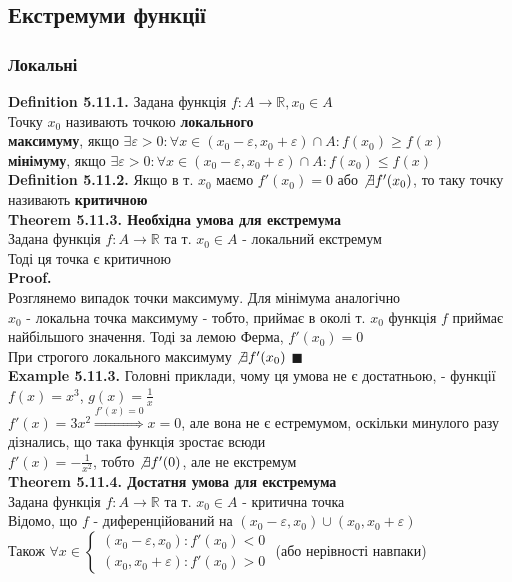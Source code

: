 \documentclass[a4paper, 14pt]{extarticle}
\def\huge{\displaystyle}
\def\bigline{\vspace{5mm}\\}
\def\defin#1{\textbf{Definition {#1}}}
\def\ex#1{\textbf{Example {#1}}}
\def\th#1{\textbf{Theorem {#1}}}
\def\proof{\textbf{Proof.}\\}
\def\bigline{\vspace{5mm}\\}
\def\qed{$\blacksquare$}
\begin{document}
\subsection{Екстремуми функції}
\subsubsection{Локальні}
\defin{5.11.1.} Задана функція $f: A \to \mathbb{R}, x_0 \in A$\\
Точку $x_0$ називають точкою \textbf{локального}\\
\textbf{максимуму}, якщо $\exists \varepsilon > 0: \forall x \in (x_0-\varepsilon, x_0 +\varepsilon) \cap A: f(x_0) \geq f(x)$\\
\textbf{мінімуму}, якщо $\exists \varepsilon > 0: \forall x \in (x_0-\varepsilon, x_0 +\varepsilon) \cap A: f(x_0) \leq f(x)$
\bigline
\defin{5.11.2.} Якщо в т. $x_0$ маємо $f'(x_0) = 0$ або $\not\exists f'(x_0)$, то таку точку називають \textbf{критичною}
\bigline
\th{5.11.3. Необхідна умова для екстремума}\\
Задана функція $f: A \to \mathbb{R}$ та т. $x_0 \in A$ - локальний екстремум\\
Тоді ця точка є критичною\\
\proof
Розглянемо випадок точки максимуму. Для мінімума аналогічно\\
$x_0$ - локальна точка максимуму - тобто, приймає в околі т. $x_0$ функція $f$ приймає найбільшого значення. Тоді за лемою Ферма, $f'(x_0) = 0$\\
При строгого локального максимуму $\not\exists f'(x_0)$ \qed
\bigline
\ex{5.11.3.} Головні приклади, чому ця умова не є достатньою, - функції $f(x) = x^3$, $g(x) = \huge \frac{1}{x}$\\
$f'(x) = 3x^2 \overset{f'(x) = 0}{\Rightarrow} x = 0$, але вона не є естремумом, оскільки минулого разу дізнались, що така функція зростає всюди\\
$f'(x) = \huge -\frac{1}{x^2}$, тобто $\not\exists f'(0)$, але не екстремум
\bigline
\th{5.11.4. Достатня умова для екстремума}\\
Задана функція $f: A \to \mathbb{R}$ та т. $x_0 \in A$ - критична точка\\
Відомо, що $f$ - диференційований на $(x_0-\varepsilon,x_0) \cup (x_0, x_0+\varepsilon)$\\
Також $\forall x \in \begin{cases} (x_0-\varepsilon,x_0): f'(x_0) < 0 \\ (x_0,x_0+\varepsilon): f'(x_0) > 0 \end{cases}$ (або нерівності навпаки)\\
\end{document}
